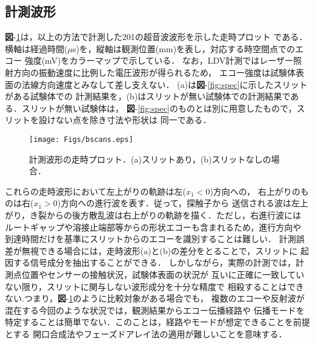 \subsection{計測波形}
{\bf 図}-\ref{fig:bscans}は，以上の方法で計測した201の超音波波形を示した走時プロット
である．横軸は経過時間($\mu$s)を，縦軸は観測位置(mm)を表し，対応する時空間点でのエコー
強度(mV)をカラーマップで示している．
%
なお，LDV計測ではレーザー照射方向の振動速度に比例した電圧波形が得られるため，
エコー強度は試験体表面の法線方向速度とみなして差し支えない．
%
(a)は{\bf 図}-\ref{fig:spec}に示したスリットがある試験体での
計測結果を，(b)はスリットが無い試験体での計測結果である．スリットが無い試験体は，
{\bf 図}-\ref{fig:spec}のものとは別に用意したもので，スリットを設けない点を除き寸法や形状は
同一である．
\begin{figure}[bht]
\centering
	\texttt{[image: Figs/bscans.eps]}
	\caption{計測波形の走時プロット．(a)スリットあり，(b)スリットなしの場合．}
	\label{fig:bscans}
\end{figure}
これらの走時波形において左上がりの軌跡は左($x_1<0$)方向への，
右上がりのものは右($x_1>0$)方向への進行波を表す．従って，探触子から
送信される波は左上がり，き裂からの後方散乱波は右上がりの軌跡を描く．ただし，右進行波には
ルートギャップや溶接止端部等からの形状エコーも含まれるため，進行方向や
到達時間だけを基準にスリットからのエコーを識別することは難しい．
%
計測誤差が無視できる場合には，走時波形(a)と(b)の差分をとることで，スリットに
起因する信号成分を抽出することができる．
%
しかしながら，実際の計測では，計測点位置やセンサーの接触状況，試験体表面の状況が
互いに正確に一致していない限り，スリットに関与しない波形成分を十分な精度で
相殺することはできない.つまり，{\bf 図}-\ref{fig:bscans}のように比較対象がある場合でも，
複数のエコーや反射波が混在する今回のような状況では，観測結果からエコー伝播経路や
伝播モードを特定することは簡単でない．このことは，経路やモードが想定できることを前提とする
開口合成法やフェーズドアレイ法の適用が難しいことを意味する．


